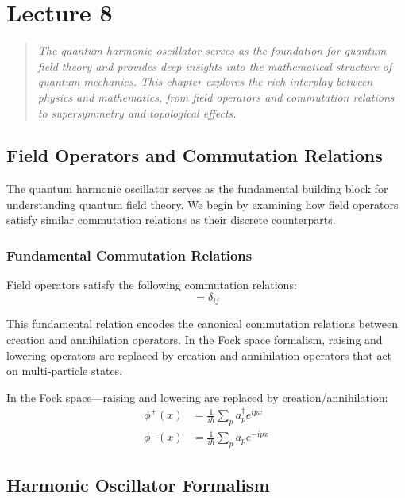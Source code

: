 \newpage 

\section{Lecture 8}
\begin{quote}
\textit{The quantum harmonic oscillator serves as the foundation for quantum field theory and provides deep insights into the mathematical structure of quantum mechanics. This chapter explores the rich interplay between physics and mathematics, from field operators and commutation relations to supersymmetry and topological effects.}
\end{quote}

\subsection{Field Operators and Commutation Relations}

The quantum harmonic oscillator serves as the fundamental building block for understanding quantum field theory. We begin by examining how field operators satisfy similar commutation relations as their discrete counterparts.

\subsubsection{Fundamental Commutation Relations}

Field operators satisfy the following commutation relations:
\begin{equation}
[a_i, a_j^\dagger] = \delta_{ij}
\end{equation}

This fundamental relation encodes the canonical commutation relations between creation and annihilation operators. In the Fock space formalism, raising and lowering operators are replaced by creation and annihilation operators that act on multi-particle states.

In the Fock space—raising and lowering are replaced by creation/annihilation:
\begin{align}
\phi^+(x) &= \frac{1}{i\hbar}\sum_p a_p^\dagger e^{ipx} \\
\phi^-(x) &= \frac{1}{i\hbar}\sum_p a_p e^{-ipx}
\end{align}

\subsection{Harmonic Oscillator Formalism}

